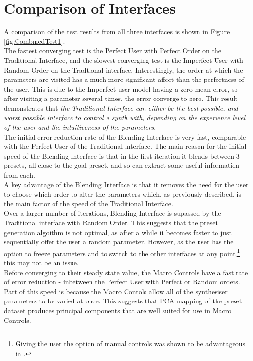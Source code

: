 \documentclass[11pt, oneside]{report}   	%
\begin{document}
\section{Comparison of Interfaces}
A comparison of the test results from all three interfaces is shown in Figure \ref{fig:CombinedTest1}.  
\\
The fastest converging test is the Perfect User with Perfect Order on the Traditional Interface, and the slowest converging test is the Imperfect User with Random Order on the Tradtional interface. Interestingly, the order at which the parameters are visited has a much more significant affect than the perfectness of the user. This is due to the Imperfect user model having a zero mean error, so after visiting a parameter several times, the error converge to zero. This result demonstrates that \emph{the Traditional Interface can either be the best possible, and worst possible interface to control a synth with, depending on the experience level of the user and the intuitiveness of the parameters}.
\\
The initial error reduction rate of the Blending Interface is very fast, comparable with the Perfect User of the Traditional interface. The main reason for the initial speed of the Blending Interface is that in the first iteration it blends between 3 presets, all close to the goal preset, and so can extract some useful information from each.\\
A key advantage of the Blending Interface is that it removes the need for the user to choose which order to alter the parameters which, as previously described, is the main factor of the speed of the Traditional Interface.\\
 Over a larger number of iterations, Blending Interface is supassed by the Traditional interface with Random Order. This suggests that the preset generation algoithm is not optimal, as after a while it becomes faster to just sequentially offer the user a random parameter. However, as the user has the option to freeze parameters and to switch to the other interfaces at any point,\footnote{Giving the user the option of manual controls was shown to be advantageous in \cite{PreferenceGallery}.} this may not be an issue. \\
Before converging to their steady state value, the Macro Controls have a fast rate of error reduction - inbetween the Perfect User with Perfect or Random orders. Part of this speed is because the Macro Contols allow all of the synthesiser parameters to be varied at once. This suggests that PCA mapping of the preset dataset produces principal components that are well suited for use in Macro Controls.\\
\end{document}
